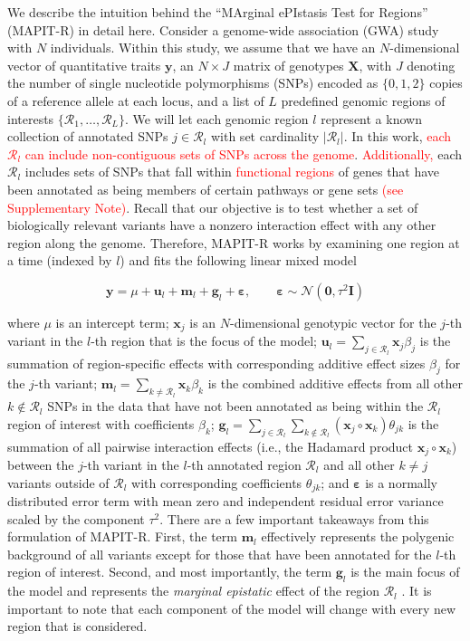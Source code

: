 \documentclass[10pt]{article}
\newcommand{\bg}{\mathbf{g}}
\newcommand{\bx}{\mathbf{x}}
\newcommand{\by}{\mathbf{y}}
\newcommand{\bu}{\mathbf{u}}
\newcommand{\bfm}{\mathbf{m}}
\newcommand{\bX}{\mathbf{X}}
\newcommand{\bI}{\mathbf{I}}
\newcommand{\N}{\mathcal{N}}
\newcommand{\bvarepsilon}{\boldsymbol\varepsilon}
\begin{document}
We describe the intuition behind the ``MArginal ePIstasis Test for Regions'' (MAPIT-R) in detail here. Consider a genome-wide association (GWA) study with $N$ individuals. Within this study, we assume that we have an $N$-dimensional vector of quantitative traits $\by$, an $N\times J$ matrix of genotypes $\bX$, with $J$ denoting the number of single nucleotide polymorphisms (SNPs) encoded as $\{0,1,2\}$ copies of a reference allele at each locus, and a list of $L$ predefined genomic regions of interests $\{\mathcal{R}_1,\ldots,\mathcal{R}_L\}$. We will let each genomic region $l$ represent a known collection of annotated SNPs $j\in\mathcal{R}_l$ with set cardinality $|\mathcal{R}_l|$. In this work, \textcolor{red}{each $\mathcal{R}_l$ can include non-contiguous sets of SNPs across the genome}. \textcolor{red}{Additionally,} each $\mathcal{R}_l$ includes sets of SNPs that fall within \textcolor{red}{functional regions} of genes that have been annotated as being members of certain pathways or gene sets \textcolor{red}{(see Supplementary Note)}. Recall that our objective is to test whether a set of biologically relevant variants have a nonzero interaction effect with any other region along the genome. Therefore, MAPIT-R works by examining one region at a time (indexed by $l$) and fits the following linear mixed model
\begin{linenomath*}
\begin{equation}
\by = \mu + \bu_l + \bfm_l + \bg_l +\bvarepsilon, \quad\quad \bvarepsilon\sim\N(\bm{0},\tau^2\bI)\label{mapit_r}
\end{equation}
\end{linenomath*}
where $\mu$ is an intercept term; $\bx_j$ is an $N$-dimensional genotypic vector for the $j$-th variant in the $l$-th region that is the focus of the model; $\bu_l = \sum_{j\in\mathcal{R}_l}\bx_j\beta_j$ is the summation of region-specific effects with corresponding additive effect sizes $\beta_j$ for the $j$-th variant; $\bfm_l = \sum_{k\ne\mathcal{R}_l}\bx_k\beta_k$ is the combined additive effects from all other $k\not\in\mathcal{R}_l$ SNPs in the data that have not been annotated as being within the $\mathcal{R}_l$ region of interest with coefficients $\beta_k$; $\bg_l = \sum_{j\in\mathcal{R}_l}\sum_{k\not\in\mathcal{R}_l}(\bx_j\circ\bx_k)\theta_{jk}$ is the summation of all pairwise interaction effects (i.e., the Hadamard product $\bx_j\circ\bx_k$) between the $j$-th variant in the $l$-th annotated region $\mathcal{R}_l$ and all other $k\ne j$ variants outside of $\mathcal{R}_l$ with corresponding coefficients $\theta_{jk}$; and $\bvarepsilon$ is a normally distributed error term with mean zero and independent residual error variance scaled by the component $\tau^2$. There are a few important takeaways from this formulation of MAPIT-R. First, the term $\bfm_l$ effectively represents the polygenic background of all variants except for those that have been annotated for the $l$-th region of interest. Second, and most importantly, the term $\bg_l$ is the main focus of the model and represents the \textit{marginal epistatic} effect of the region $\mathcal{R}_l$ \cite{Crawford2017a,Crawford2018b}. It is important to note that each component of the model will change with every new region that is considered.
\end{document}
